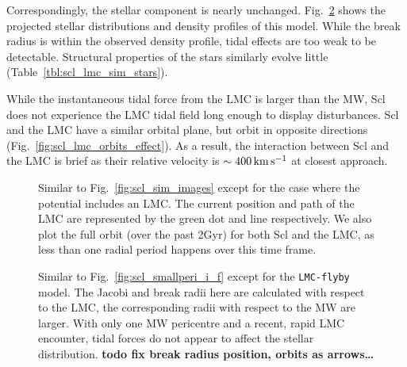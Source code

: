 Correspondingly, the stellar component is nearly unchanged.
Fig.~\ref{fig:scl_lmc_i_f} shows the projected stellar distributions and
density profiles of this model. While the break radius is within the
observed density profile, tidal effects are too weak to be detectable.
Structural properties of the stars similarly evolve little
(Table~\ref{tbl:scl_lmc_sim_stars}).

While the instantaneous tidal force from the LMC is larger than the MW,
Scl does not experience the LMC tidal field long enough to display
disturbances. Scl and the LMC have a similar orbital plane, but orbit in
opposite directions (Fig.~\ref{fig:scl_lmc_orbits_effect}). As a result,
the interaction between Scl and the LMC is brief as their relative
velocity is \(\sim 400\,{\rm km\,s^{-1}}\) at closest approach.

\begin{figure}
\centering
{}
\caption[Sculptor simulation snapshots with LMC]{Similar to
Fig.~\ref{fig:scl_sim_images} except for the case where the potential
includes an LMC. The current position and path of the LMC are
represented by the green dot and line respectively. We also plot the
full orbit (over the past 2Gyr) for both Scl and the LMC, as less than
one radial period happens over this time
frame.}\label{fig:scl_lmc_sim_images}
\end{figure}

\begin{figure}
\centering
{}
\caption[Sculptor initial and final density with LMC]{Similar to
Fig.~\ref{fig:scl_smallperi_i_f} except for the \texttt{LMC-flyby}
model. The Jacobi and break radii here are calculated with respect to
the LMC, the corresponding radii with respect to the MW are larger. With
only one MW pericentre and a recent, rapid LMC encounter, tidal forces
do not appear to affect the stellar distribution. \textbf{todo fix break
radius position, orbits as arrows\ldots{}}}\label{fig:scl_lmc_i_f}
\end{figure}

